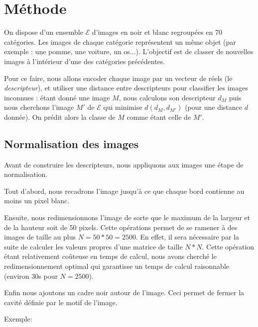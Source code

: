 \documentclass[a4paper,10pt]{article} %
\theoremstyle{definition} %
\begin{document}
\section{Méthode}

On dispose d'un ensemble $\mathcal{E}$ d'images en noir et blanc regroupées en 70 catégories. Les images de chaque catégorie représentent un même objet (par exemple : une pomme, une voiture, un os...). L'objectif est de classer de nouvelles images à l'intérieur d'une des catégories précédentes.

Pour ce faire, nous allons encoder chaque image par un vecteur de réels (le \textit{descripteur}), et utiliser une distance entre descripteurs pour classifier les images inconnues : étant donné une image $M$, nous calculons son descripteur $d_M$ puis nous cherchons l'image $M'$ de $\mathcal{E}$ qui minimise $d(d_M, d_{M'})$ (pour une distance $d$ donnée). On prédit alors la classe de $M$ comme étant celle de $M'$.


\subsection{Normalisation des images}

Avant de construire les descripteurs, nous appliquons aux images une étape de normalisation.

Tout d'abord, nous recadrons l'image jusqu'à ce que chaque bord contienne au moins un pixel blanc.

Ensuite, nous redimensionnons l'image de sorte que le maximum de la largeur et de la hauteur soit de 50 pixels. Cette opérations permet de se ramener à des images de taille au plus $N = 50*50 = 2500$. En effet, il sera nécessaire par la suite de calculer les valeurs propres d'une matrice de taille $N*N$. Cette opération étant relativement coûteuse en temps de calcul, nous avons cherché le redimensionnement optimal qui garantisse un temps de calcul raisonnable (environ 30s pour $N = 2500$).

Enfin nous ajoutons un cadre noir autour de l'image. Ceci permet de fermer la cavité définie par le motif de l'image.

Exemple:
\end{document}
